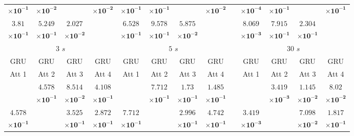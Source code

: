 \begin{table}[!ht]
{\begin{tabular}{|c|c|c|c|c|c|c|c|c|c|c|c|c|c|}
			$\mathbf{\times 10^{-1}}$ & $\mathbf{\times 10^{-2}}$ & & $\mathbf{\times 10^{-2}}$ & $\mathbf{\times 10^{-1}}$ & $\mathbf{\times 10^{-1}}$ & & $\mathbf{\times 10^{-2}}$ & \multicolumn{2}{c}{} & $\mathbf{\times 10^{-4}}$ & $\mathbf{\times 10^{-1}}$ & & $\mathbf{\times 10^{-1}}$\\ \cline{1-8} \cline{11-14}
			$\mathbf{3.81}$ & $\mathbf{5.249}$ & $\mathbf{2.027}$ & \multirow{2}{*}{} & $\mathbf{6.528}$ & $\mathbf{9.578}$ & $\mathbf{5.875}$ & \multirow{2}{*}{} & \multicolumn{2}{c}{} & $\mathbf{8.069}$ & $\mathbf{7.915}$ & $\mathbf{2.304}$ & \multirow{2}{*}{} \\ 
			$\mathbf{\times 10^{-1}}$ & $\mathbf{\times 10^{-1}}$ & $\mathbf{\times 10^{-2}}$ & & $\mathbf{\times 10^{-1}}$ & $\mathbf{\times 10^{-1}}$ & $\mathbf{\times 10^{-2}}$ & & \multicolumn{2}{c}{} & $\mathbf{\times 10^{-3}}$ & $\mathbf{\times 10^{-1}}$ & $\mathbf{\times 10^{-1}}$ & \\ \cline{1-8} \cline{11-14}
			\multicolumn{4}{c}{$3$ $s$} & \multicolumn{4}{c}{$5$ $s$} & \multicolumn{2}{c}{} & \multicolumn{4}{c}{$30$ $s$} \\ \cline{1-8} \cline{11-14}
			GRU & GRU & GRU & GRU & GRU & GRU & GRU & GRU & \multicolumn{2}{c}{} & GRU & GRU & GRU & GRU\\ 
			Att 1 & Att 2 & Att 3 & Att 4 & Att 1 & Att 2 & Att 3 & Att 4 & \multicolumn{2}{c}{} & Att 1 & Att 2 & Att 3 & Att 4\\ \cline{1-8} \cline{11-14}
			\multirow{2}{*}{} & $\mathbf{4.578}$ & $\mathbf{8.514}$ & $\mathbf{4.108}$ & \multirow{2}{*}{} & $\mathbf{7.712}$ & $\mathbf{1.73}$ & $\mathbf{1.485}$ & \multicolumn{2}{c}{} & \multirow{2}{*}{} & $\mathbf{3.419}$ & $\mathbf{1.145}$ & $\mathbf{8.02}$\\ 
			 & $\mathbf{\times 10^{-1}}$ & $\mathbf{\times 10^{-2}}$ & $\mathbf{\times 10^{-1}}$ & & $\mathbf{\times 10^{-1}}$ & $\mathbf{\times 10^{-1}}$ & $\mathbf{\times 10^{-1}}$ & \multicolumn{2}{c}{} & & $\mathbf{\times 10^{-3}}$ & $\mathbf{\times 10^{-2}}$ & $\mathbf{\times 10^{-2}}$\\ \cline{1-8} \cline{11-14}
			$\mathbf{4.578}$ & \multirow{2}{*}{} & $\mathbf{3.525}$ & $\mathbf{2.872}$ & $\mathbf{7.712}$ & \multirow{2}{*}{} & $\mathbf{2.996}$ & $\mathbf{4.742}$ & \multicolumn{2}{c}{} & $\mathbf{3.419}$ & \multirow{2}{*}{} & $\mathbf{7.098}$ & $\mathbf{1.817}$\\ 
			$\mathbf{\times 10^{-1}}$ & & $\mathbf{\times 10^{-1}}$ & $\mathbf{\times 10^{-1}}$ & $\mathbf{\times 10^{-1}}$ & & $\mathbf{\times 10^{-1}}$ & $\mathbf{\times 10^{-1}}$ & \multicolumn{2}{c}{} & $\mathbf{\times 10^{-3}}$ & & $\mathbf{\times 10^{-2}}$ & $\mathbf{\times 10^{-1}}$\\ \cline{1-8} \cline{11-14}

\end{tabular}}
\end{table}
